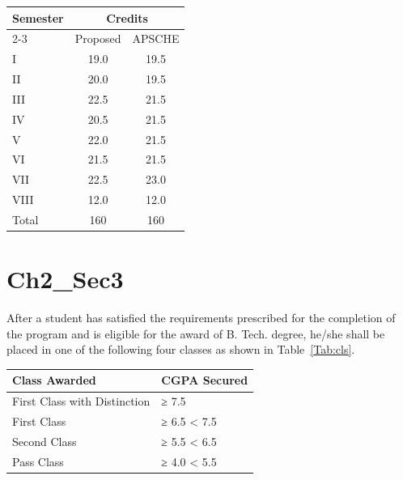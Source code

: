 \begin{minipage}{\textwidth}
\centering
{}
\begin{tabular}{lcc}
\toprule 
\multirow{2}{*}{Semester}	&	\multicolumn{2}{c}{Credits}\\	
\cmidrule{2-3}
                           & Proposed & APSCHE \\ 
\midrule
I 				& 19.0		& 19.5 \\

II 				& 20.0		& 19.5 \\

III 			& 22.5		& 21.5 \\

IV 				& 20.5		& 21.5 \\

V 				& 22.0		& 21.5 \\

VI 				& 21.5		& 21.5 \\

VII 			& 22.5		& 23.0 \\

VIII 			& 12.0		& 12.0 \\
\midrule
Total			& 160       & 160 \\ 
\bottomrule
\end{tabular}
\label{Tab:doc}
\end{minipage}

\section{Ch2\_Sec3}

After a student has satisfied the requirements prescribed for the completion of the program and is eligible for the award of B. Tech. degree, he/she shall be placed in one of the following four classes as shown in Table~\ref{Tab:cls}.

\begin{minipage}{\textwidth}
\centering
{}
\begin{tabular}{ll}
\toprule
\textbf{Class Awarded}	& \textbf{CGPA Secured} \\
\midrule
First Class with Distinction &	≥ 7.5 \\
First Class	& ≥ 6.5 < 7.5 \\
Second Class &	≥ 5.5 < 6.5 \\
Pass Class	& ≥ 4.0 < 5.5 \\
\bottomrule
\end{tabular}
\label{Tab:cls}
\end{minipage}






